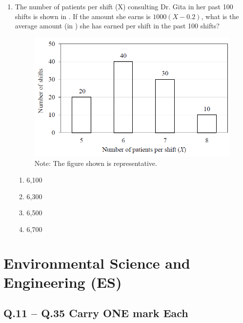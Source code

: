 \documentclass[journal]{IEEEtran}
\begin{document}
\begin{enumerate}
\item The number of patients per shift (X) consulting Dr. Gita in her past 100 shifts is shown in . If the amount she earns is \rupee$1000(X-0.2)$, what is the average amount (in \rupee) she has earned per shift in the past 100 shifts?
\hfill{}
\begin{figure}[H]
    \centering
    \includegraphics[width=0.6\columnwidth]{figs/fig3.png}
    \caption{Note: The figure shown is representative.}
    \label{fig3}
\end{figure}
\begin{enumerate}
\item 6,100
\item 6,300
\item 6,500
\item 6,700
\end{enumerate}
\end{enumerate}

\section*{Environmental Science and Engineering (ES)}

\subsection*{Q.11 -- Q.35 Carry ONE mark Each}
\end{document}
